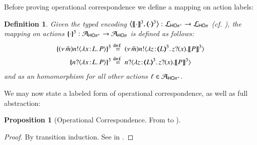 \documentclass[preprint,11pt]{elsarticle}
\newtheorem{definition}{Definition}[section]
\newtheorem{proposition}{Proposition}[section]
\begin{document}
{%


Before proving operational correspondence we
define a mapping on action labels:
\begin{definition}
\label{d:actmap3}
Given 
the typed encoding
$\big\langle \llbracket\cdot\rrbracket^{3}, (\!\!\langle\cdot\rangle\!\!)^{3}\big\rangle: \mathcal{L}_\mathsf{HO\pi^{+}} \to \mathcal{L}_{\mathsf{HO}\pi}$ (cf. ),
the mapping on actions $\{\!\!\{\cdot\}\!\!\}^{3}: \mathcal{A}_\mathsf{HO\pi^{+}} \to \mathcal{A}_{\mathsf{HO}\pi}$  is defined as follows:
	\begin{align*}
		\mapa{\news{\tilde{m}} \bactout{n}{\abs{\AT{x}{L}}{P}}}^{3} 
		& \defeq
		\news{\tilde{m}} \bactout{n}{\abs{\AT{z}{\tmap{L}{3}}}{\binp{z}{x} \pmap{P}{3}}}
		\\
		\mapa{\bactinp{n}{\abs{\AT{x}{L}}{P}}}^{3}
		& \defeq \bactinp{n}{\abs{\AT{z}{\tmap{L}{3}}}{\binp{z}{x} \pmap{P}{3}}}
	\end{align*}
	and as an homomorphism for all other actions $\ell \in \mathcal{A}_\mathsf{HO\pi^{+}}$.
\end{definition}


We may now state a labeled form of operational correspondence, as well as full abstraction:

\begin{proposition}[Operational Correspondence. From \HOpp to \HOp]%
	\label{prop:op_corr_HOpp_to_HOp}
	
	\end{proposition}

\begin{proof}
	By transition induction.
	See  in .
	\end{proof}

}
\end{document}
